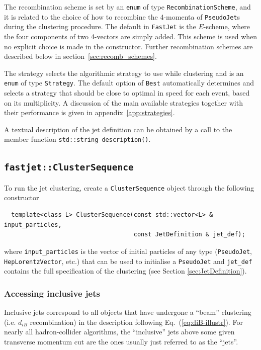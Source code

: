 \documentclass[12pt,a4]{article}
\newcommand{\fastjet}{\texttt{FastJet}\xspace}
\newcommand{\ttt}[1]{{\small\texttt{#1}}}
\begin{document}
The recombination scheme is set by an \ttt{enum} of type
\ttt{RecombinationScheme}, and it is related to the choice of how to
recombine the 4-momenta of \ttt{PseudoJet}s during the clustering procedure.
The default in \fastjet is the $E$-scheme, where the four components of
two 4-vectors are simply added.
%
This scheme is used when no explicit choice is made in the
constructor. 
%
Further recombination schemes are described below in
section~\ref{sec:recomb_schemes}.


The strategy selects the algorithmic strategy to use while clustering
and is an \ttt{enum} of type \ttt{Strategy}. The default option of
\ttt{Best} automatically determines and selects a strategy that
should be close to optimal in speed for each event, based on its
multiplicity. 
%
A discussion of the main available strategies together with their
performance is given in appendix~\ref{app:strategies}.

A textual description of the jet definition can be obtained by a call
to the member function \ttt{std::string description()}.

\subsection{\tt fastjet::ClusterSequence}
\label{sec:ClusterSequence}

To run the jet clustering, create a \ttt{ClusterSequence}
object
through the following constructor
\begin{lstlisting}
  template<class L> ClusterSequence(const std::vector<L> & input_particles,
                                    const JetDefinition & jet_def); 
\end{lstlisting}
where \ttt{input\_particles} is the vector of initial particles of any
type (\ttt{PseudoJet}, \ttt{HepLorentzVector}, etc.) that can be
used to initialise a \ttt{PseudoJet} and \ttt{jet\_def} contains
the full specification of the clustering (see Section
\ref{sec:JetDefinition}).

\subsubsection{Accessing inclusive jets}

Inclusive jets correspond to all objects that have undergone a
``beam'' clustering (i.e. $d_{iB}$ recombination) in the description
following Eq.~(\ref{eq:diB-illustr}).
%
For nearly all hadron-collider algorithms, the ``inclusive'' jets
above some given transverse momentum cut are the ones usually just
referred to as the ``jets''.
\end{document}
